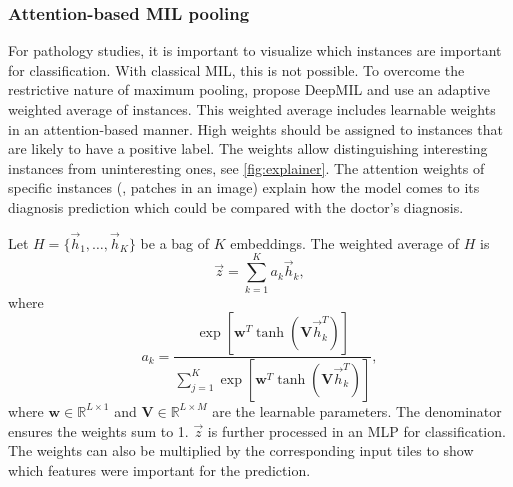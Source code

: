 \subsubsection{Attention-based MIL pooling}
For pathology studies, it is important to visualize which instances are important for classification.
With classical MIL, this is not possible.
To overcome the restrictive nature of maximum pooling, \citeauthor{Ilse2018}  propose DeepMIL and use an adaptive weighted average of instances.
This weighted average includes learnable weights in an attention-based manner.
High weights should be assigned to instances that are likely to have a positive label.
The weights allow distinguishing interesting instances from uninteresting ones, see \cref{fig:explainer}.
The attention weights of specific instances (\eg, patches in an image) explain how the model comes to its diagnosis prediction which could be compared with the doctor's diagnosis.

Let $H=\{\vec{h}_1, \ldots, \vec{h}_K\}$ be a bag of $K$ embeddings.
The weighted average of $H$ is
\begin{equation}
    \vec{z}=\sum_{k=1}^{K}a_k\vec{h}_k,
\end{equation}
where
\begin{equation}
    a_k = \frac{\exp\left[\mathbf{w}^T \tanh (\mathbf{V}\vec{h}_k^T)\right]}{\sum_{j=1}^{K}\exp\left[\mathbf{w}^T \tanh (\mathbf{V}\vec{h}_k^T)\right]},
\end{equation}
where $\mathbf{w} \in \mathbb{R}^{L \times 1}$ and $\mathbf{V}\in \mathbb{R}^{L \times M}$ are the learnable parameters.
The denominator ensures the weights sum to 1.
$\vec{z}$ is further processed in an MLP for classification.
The weights can also be multiplied by the corresponding input tiles to show which features were important for the prediction.

\begin{figure*}
    \centering
    
    \caption[Tile importances]{
        Visualizing tile importances.
        The attention weights resulting from VarMIL are min-max-normalized and multiplied with their corresponding tile.
        The output is an attention weighted image with bright parts relating to high attention and dark parts relating to low attention.
        Note that dark tiles can still have high attentions if the original image contains dark patches with useful information.
    }
    \label{fig:explainer}
\end{figure*}

